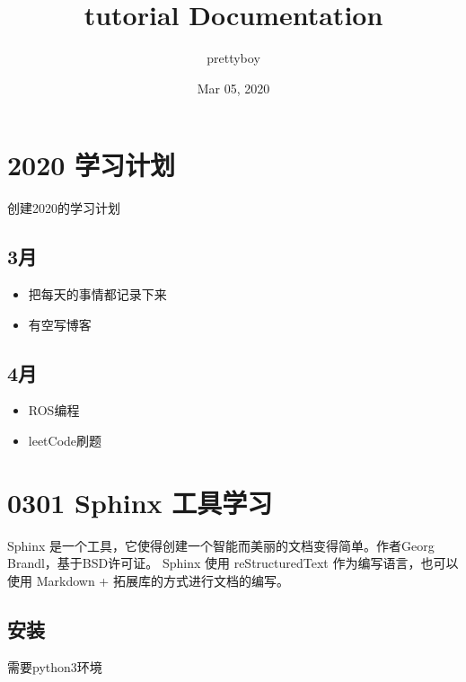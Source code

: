 \documentclass[letterpaper,10pt,english]{sphinxmanual}
\title{tutorial Documentation}
\date{Mar 05, 2020}
\author{prettyboy}
\begin{document}
\maketitle
\sphinxtableofcontents
{}\label{\detokenize{index::doc}}



\chapter{2020 学习计划}
\label{\detokenize{usage/installation:id1}}\label{\detokenize{usage/installation::doc}}
创建2020的学习计划


\section{3月}
\label{\detokenize{usage/installation:id2}}
\begin{itemize}
\item {} 
把每天的事情都记录下来

\item {} 
有空写博客

\end{itemize}


\section{4月}
\label{\detokenize{usage/installation:id3}}
\begin{itemize}
\item {} 
ROS编程

\item {} 
leetCode刷题

\end{itemize}


\chapter{0301 Sphinx 工具学习}
\label{\detokenize{usage/quickstart::doc}}\label{\detokenize{usage/quickstart:sphinx}}
Sphinx 是一个工具，它使得创建一个智能而美丽的文档变得简单。作者Georg Brandl，基于BSD许可证。
Sphinx 使用 reStructuredText 作为编写语言，也可以使用 Markdown + 拓展库的方式进行文档的编写。


\section{安装}
\label{\detokenize{usage/quickstart:id1}}
需要python3环境
\end{document}
